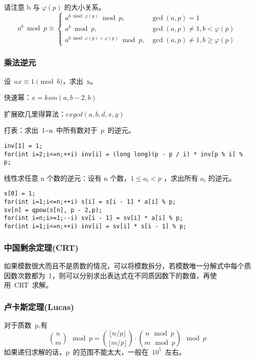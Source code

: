 \documentclass[UTF8]{ctexart}
\begin{document}
请注意 b 与 $\varphi(p)$ 的大小关系。
$$
a^b \bmod p \equiv 
\begin{cases}
    a^{b \bmod \varphi(p)} \bmod p, & \gcd(a,p)=1 \\ 
    a^b \bmod p , & \gcd(a,p) \neq 1,b < \varphi(p) \\ 
    a^{b \bmod \varphi(p)+\varphi(p)} \bmod p , & \gcd(a,p) \neq 1, b \geq \varphi(p)
\end{cases}
$$

\subsubsection{乘法逆元}
设\ $ax \equiv 1 \pmod{b}$，求出\ x。

快速幂：$x = ksm(a,b-2,b)$

扩展欧几里得算法：$exgcd(a,b,d,x,y)$

打表：求出\ 1\~{}n\ 中所有数对于\ $p$\ 的逆元。

\begin{framed}
\begin{lstlisting}
inv[1] = 1;
for(int i=2;i<=n;++i) inv[i] = (long long)(p - p / i) * inv[p % i] % p;
\end{lstlisting}
\end{framed}

线性求任意 n 个数的逆元：设有 n 个数，$1 \leq a_i < p$ ，求出所有 $a_i$ 的逆元。

\begin{framed}
\begin{lstlisting}
s[0] = 1;
for(int i=1;i<=n;++i) s[i] = s[i - 1] * a[i] % p;
sv[n] = qpow(s[n], p - 2,p);
for(int i=n;i>=1;--i) sv[i - 1] = sv[i] * a[i] % p;
for(int i=1;i<=n;++i) inv[i] = sv[i] * s[i - 1] % p;
\end{lstlisting}
\end{framed}

\subsubsection{中国剩余定理(CRT)}
如果模数很大而且不是质数的情况，可以将模数拆分，若模数唯一分解式中每个质因数次数都为\ 1，则可以分别求出表达式在不同质因数下的数值，再使用\ CRT\ 求解。

\subsubsection{卢卡斯定理(Lucas)}
对于质数\ p,有
$$
{n \choose m} \mod p = {\lfloor n/p \rfloor \choose \lfloor m/p \rfloor} \cdot {n \mod p \choose m \mod p} \mod p
$$
如果递归求解的话，p\ 的范围不能太大，一般在\ $10^5$\ 左右。
\end{document}
